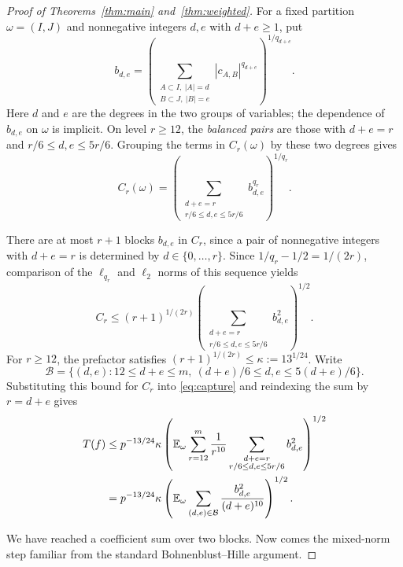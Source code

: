 \documentclass[11pt]{amsart}
\theoremstyle{remark}
\numberwithin{equation}{section}
\newcommand{\E}{\mathbb E}
\newcommand{\bal}{\mathcal B}
\begin{document}
\begin{proof}[Proof of Theorems~\ref{thm:main} and~\ref{thm:weighted}]
For a fixed partition $\omega=(I,J)$ and nonnegative integers $d,e$ with
$d+e\ge1$, put
\[
b_{d,e}=\left(
\sum_{\substack{A\subset I,\ |A|=d\\B\subset J,\ |B|=e}}
|c_{A,B}|^{q_{d+e}}\right)^{1/q_{d+e}}.
\]
Here $d$ and $e$ are the degrees in the two groups of variables; the
dependence of $b_{d,e}$ on $\omega$ is implicit.
On level $r\ge12$, the \emph{balanced pairs} are those with $d+e=r$
and $r/6\le d,e\le5r/6$. Grouping the terms in $C_r(\omega)$ by these
two degrees gives
\[
C_r(\omega)=
\left(\sum_{\substack{d+e=r\\r/6\le d,e\le5r/6}}
b_{d,e}^{q_r}\right)^{1/q_r}.
\]

There are at most $r+1$ blocks $b_{d,e}$ in $C_r$, since a pair of
nonnegative integers with $d+e=r$ is determined by $d\in\{0,\ldots,r\}$.
Since $1/q_r-1/2=1/(2r)$, comparison of the $\ell_{q_r}$ and $\ell_2$
norms of this sequence yields
\[
C_r\le(r+1)^{1/(2r)}
\left(\sum_{\substack{d+e=r\\r/6\le d,e\le5r/6}}b_{d,e}^2\right)^{1/2}.
\]
For $r\ge12$, the prefactor satisfies
$(r+1)^{1/(2r)}\le\kappa:=13^{1/24}$.
Write
\[
\bal=\{(d,e):12\le d+e\le m,\ (d+e)/6\le d,e\le5(d+e)/6\}.
\]
Substituting this bound for $C_r$ into \eqref{eq:capture} and reindexing
the sum by $r=d+e$ gives
\begin{align}
T(f)&\le p^{-13/24}\kappa
\left(\E_\omega\sum_{r=12}^m\frac1{r^{10}}
\sum_{\substack{d+e=r\\r/6\le d,e\le5r/6}}b_{d,e}^2\right)^{1/2}\notag\\
&=p^{-13/24}\kappa
\left(\E_\omega\sum_{(d,e)\in\bal}
\frac{b_{d,e}^2}{(d+e)^{10}}\right)^{1/2}.
\label{eq:blocks}
\end{align}

We have reached a coefficient sum over two blocks. Now comes the mixed-norm
step familiar from the standard Bohnenblust--Hille argument.


\end{proof}
\end{document}

